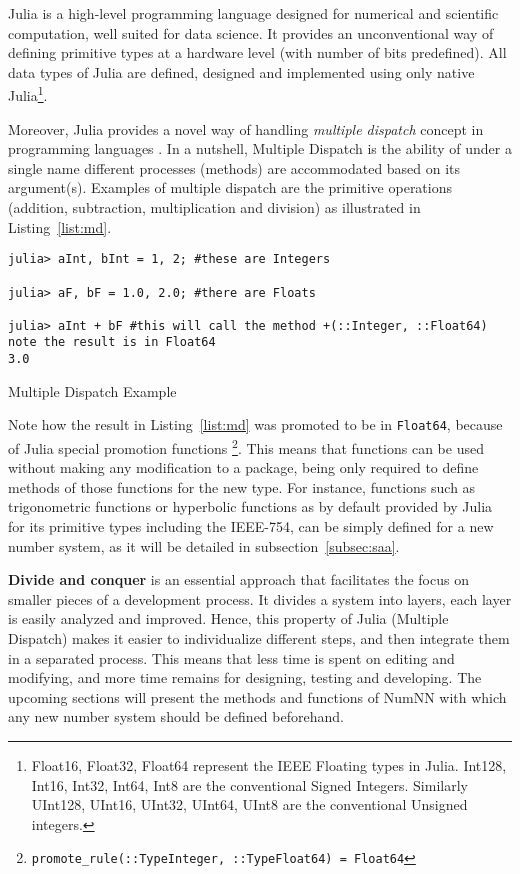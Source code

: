 Julia \cite{Julia,Bezanson2017} is a high-level programming language designed for numerical and scientific computation, well suited for data science. It provides an unconventional way of defining primitive types at a hardware level (with number of bits predefined). All data types of Julia are defined, designed and implemented using only native Julia\footnote{{Float16, Float32, Float64} represent the IEEE Floating types in Julia. {Int128, Int16, Int32, Int64, Int8} are the conventional Signed Integers. Similarly {UInt128, UInt16, UInt32, UInt64, UInt8} are the conventional Unsigned integers.}.

Moreover, Julia provides a novel way of handling \emph{multiple dispatch} \cite{WikiMultipleDispatch} concept in programming languages \cite{JuliaMehtods}. In a nutshell, Multiple Dispatch is the ability of under a single name different processes (methods) are accommodated based on its argument(s). Examples of multiple dispatch are the primitive operations (addition, subtraction, multiplication and division) as illustrated in Listing~\ref{list:md}.

\begin{listing}[H]
\begin{verbatim}
julia> aInt, bInt = 1, 2; #these are Integers

julia> aF, bF = 1.0, 2.0; #there are Floats

julia> aInt + bF #this will call the method +(::Integer, ::Float64) note the result is in Float64
3.0
\end{verbatim}
\caption{Multiple Dispatch Example}\label{list:md}
\end{listing}

Note how the result in Listing~\ref{list:md} was promoted to be in \texttt{Float64}, because of Julia special promotion functions \footnote{\texttt{promote_rule(::Type{Integer}, ::Type{Float64}) = Float64}}. This means that functions can be used without making any modification to a package, being only required to define methods of those functions for the new type. For instance, functions such as trigonometric functions or hyperbolic functions as by default provided by Julia for its primitive types including the IEEE-754, can be simply defined for a new number system, as it will be detailed in subsection~\ref{subsec:saa}.

\textbf{Divide and conquer} is an essential approach that facilitates the focus on smaller pieces of a development process. It divides a system into layers, each layer is easily analyzed and improved. Hence, this property of Julia (Multiple Dispatch) makes it easier to individualize different steps, and then integrate them in a separated process. This means that less time is spent on editing and modifying, and more time remains for designing, testing and developing. The upcoming sections will present the methods and functions of NumNN with which any new number system should be defined beforehand.

